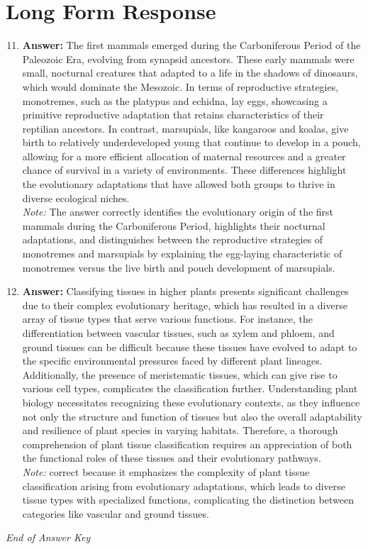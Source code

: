 \documentclass[12pt]{article}
\begin{document}
\section*{Long Form Response}
\begin{enumerate}[label=\arabic*.]
\setcounter{enumi}{10}
\item \textbf{Answer:} The first mammals emerged during the Carboniferous Period of the Paleozoic Era, evolving from synapsid ancestors. These early mammals were small, nocturnal creatures that adapted to a life in the shadows of dinosaurs, which would dominate the Mesozoic. In terms of reproductive strategies, monotremes, such as the platypus and echidna, lay eggs, showcasing a primitive reproductive adaptation that retains characteristics of their reptilian ancestors. In contrast, marsupials, like kangaroos and koalas, give birth to relatively underdeveloped young that continue to develop in a pouch, allowing for a more efficient allocation of maternal resources and a greater chance of survival in a variety of environments. These differences highlight the evolutionary adaptations that have allowed both groups to thrive in diverse ecological niches.
\\ \textit{Note:} The answer correctly identifies the evolutionary origin of the first mammals during the Carboniferous Period, highlights their nocturnal adaptations, and distinguishes between the reproductive strategies of monotremes and marsupials by explaining the egg-laying characteristic of monotremes versus the live birth and pouch development of marsupials.
\item \textbf{Answer:} Classifying tissues in higher plants presents significant challenges due to their complex evolutionary heritage, which has resulted in a diverse array of tissue types that serve various functions. For instance, the differentiation between vascular tissues, such as xylem and phloem, and ground tissues can be difficult because these tissues have evolved to adapt to the specific environmental pressures faced by different plant lineages. Additionally, the presence of meristematic tissues, which can give rise to various cell types, complicates the classification further. Understanding plant biology necessitates recognizing these evolutionary contexts, as they influence not only the structure and function of tissues but also the overall adaptability and resilience of plant species in varying habitats. Therefore, a thorough comprehension of plant tissue classification requires an appreciation of both the functional roles of these tissues and their evolutionary pathways.
\\ \textit{Note:} correct because it emphasizes the complexity of plant tissue classification arising from evolutionary adaptations, which leads to diverse tissue types with specialized functions, complicating the distinction between categories like vascular and ground tissues.
\end{enumerate}

\vfill
\noindent\textit{End of Answer Key}
\end{document}

